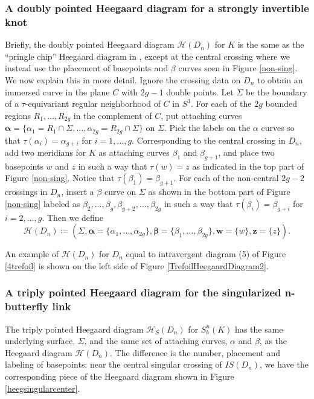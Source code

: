 \documentclass[11pt]{amsart}
\theoremstyle{definition}
\theoremstyle{remark}
\numberwithin{equation}{section}
\begin{document}
\subsubsection{A doubly pointed Heegaard diagram for a strongly invertible knot}\label{twopointdiagram} Briefly, the doubly pointed Heegaard diagram $\mathcal{H}(D_n)$ for $K$ is the same as the ``pringle chip'' Heegaard diagram in \cite[~Proposition 12.1]{OSsurvey}, except at the central crossing where we instead use the placement of basepoints and $\beta$ curves seen in Figure \ref{non-sing}. We now explain this in more detail. Ignore the crossing data on $D_n$ to obtain an immersed curve in the plane $C$ with $2g-1$ double points. Let $\Sigma$ be the boundary of a  $\tau$-equivariant regular neighborhood of $C$ in $S^3.$ For each of the $2g$ bounded regions $R_1,\hdots,R_{2g}$ in the complement of $C$, put attaching curves $\bm{\alpha}=\{\alpha_1=R_1\cap \Sigma,\hdots,\alpha_{2g}=R_{2g}\cap \Sigma\}$ on $\Sigma.$ Pick the labels on the $\alpha$ curves so that $\tau(\alpha_i)=\alpha_{g+i}$ for $i=1,\hdots,g.$ 
 Corresponding to the central crossing in $D_n$, add two meridians for $K$ as attaching curves $\beta_1$ and $\beta_{g+1}$, and place two basepoints $w$ and $z$ in such a way that $\tau(w)=z$ as indicated in the top part of Figure \ref{non-sing}.  Notice that $\tau(\beta_1)=\beta_{g+1}.$ For each of the non-central $2g-2$ crossings in $D_n$, insert a $\beta$ curve on $\Sigma$ as shown in the bottom part of Figure \ref{non-sing} labeled as $\beta_2,\hdots, \beta_g, \beta_{g+2}, \hdots, \beta_{2g}$ in such a way that $\tau(\beta_i)=\beta_{g+i}$ for $i=2,\hdots,g$. Then we define \[\mathcal{H}(D_n)\coloneq (\Sigma, \bm{\alpha}=\{\alpha_1, \hdots, \alpha_{2g}\}, \bm{\beta}=\{\beta_1,\hdots,\beta_{2g}\}, \bm{w}=\{w\}, \bm{z}=\{z\}).\]

An example of $\mathcal{H}(D_n)$ for $D_n$ equal to intravergent diagram (5) of Figure \ref{4trefoil} is shown on the left side of Figure \ref{TrefoilHeegaardDiagram2}.


\subsubsection{A triply pointed Heegaard diagram for the singularized n-butterfly link}\label{threepointdiagram}
The triply pointed Heegaard diagram $\mathcal{H}_S(D_n)$ for $S^n_b(K)$ has the same underlying surface, $\Sigma$, and the same set of attaching curves, $\alpha$ and $\beta$, as the Heegaard diagram $\mathcal{H}(D_n)$. The difference is the number, placement and labeling of basepoints: near the central singular crossing of $IS(D_n)$, we have the corresponding piece of the Heegaard diagram shown in Figure \ref{heegsingularcenter}. 
\end{document}
